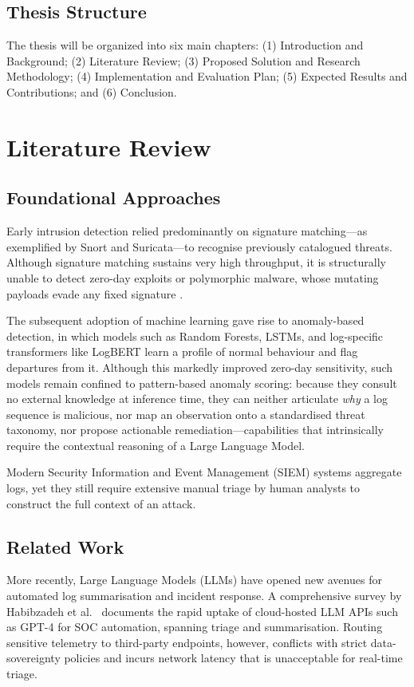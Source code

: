 \documentclass[12pt,a4paper]{article}
\begin{document}
\subsection{Thesis Structure}
The thesis will be organized into six main chapters: (1) Introduction and Background; (2) Literature Review; (3) Proposed Solution and Research Methodology; (4) Implementation and Evaluation Plan; (5) Expected Results and Contributions; and (6) Conclusion.

\newpage
\section{Literature Review}

\subsection{Foundational Approaches}
Early intrusion detection relied predominantly on signature matching---as exemplified by Snort and Suricata---to recognise previously catalogued threats. Although signature matching sustains very high throughput, it is structurally unable to detect zero-day exploits or polymorphic malware, whose mutating payloads evade any fixed signature \cite{khraisat2019}.

The subsequent adoption of machine learning gave rise to anomaly-based detection, in which models such as Random Forests, LSTMs, and log-specific transformers like LogBERT \cite{logbert2021} learn a profile of normal behaviour and flag departures from it. Although this markedly improved zero-day sensitivity, such models remain confined to pattern-based anomaly scoring: because they consult no external knowledge at inference time, they can neither articulate \textit{why} a log sequence is malicious, nor map an observation onto a standardised threat taxonomy, nor propose actionable remediation---capabilities that intrinsically require the contextual reasoning of a Large Language Model.

Modern Security Information and Event Management (SIEM) systems aggregate logs, yet they still require extensive manual triage by human analysts to construct the full context of an attack.

\subsection{Related Work}
More recently, Large Language Models (LLMs) have opened new avenues for automated log summarisation and incident response. A comprehensive survey by Habibzadeh et al.\ \cite{habibzadeh2025} documents the rapid uptake of cloud-hosted LLM APIs such as GPT-4 for SOC automation, spanning triage and summarisation. Routing sensitive telemetry to third-party endpoints, however, conflicts with strict data-sovereignty policies and incurs network latency that is unacceptable for real-time triage.
\end{document}
